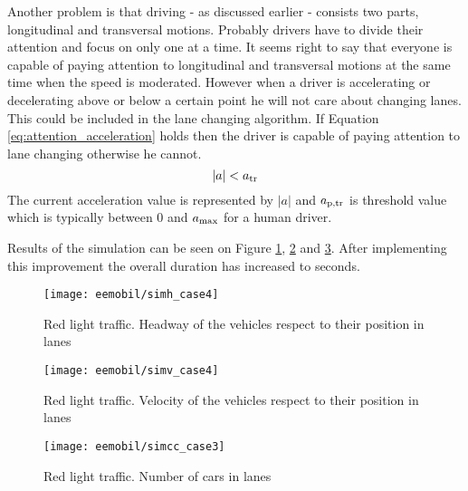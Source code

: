 		 Another problem is that driving - as discussed earlier - consists two parts, longitudinal and transversal motions. Probably drivers have to divide their attention and focus on only one at a time. It seems right to say that everyone is capable of paying attention to longitudinal and transversal motions at the same time when the speed is moderated. However when a driver is accelerating or decelerating above or below a certain point he will not care about changing lanes. This could be included in the lane changing algorithm. If Equation \ref{eq:attention_acceleration}  holds then the driver is capable of paying attention to lane changing otherwise he cannot.
		\begin{equation}
			|a|<a_{\rm tr}
			\label{eq:attention_acceleration}
		\end{equation}
		The current acceleration value is represented by $|a|$ and $a_{\rm p,tr}$ is threshold value which is typically between 0 and $a_{\rm max}$ for a human driver.
		
		Results of the simulation can be seen on Figure \ref{fig:red_light_situationh_impr3}, \ref{fig:red_light_situationv_impr3} and \ref{fig:red_light_situationcc_impr3}. After implementing this improvement the overall duration has increased to seconds.
		\begin{figure}
			\centering
			\texttt{[image: eemobil/simh\_case4]}
			\caption{Red light traffic. Headway of the vehicles respect to their position in lanes}
			\label{fig:red_light_situationh_impr3}
		\end{figure}
		\begin{figure}
			\centering
			\texttt{[image: eemobil/simv\_case4]}
			\caption{Red light traffic. Velocity of the vehicles respect to their position in lanes}
			\label{fig:red_light_situationv_impr3}
		\end{figure}
		\begin{figure}
			\centering
			\texttt{[image: eemobil/simcc\_case3]}
			\caption{Red light traffic. Number of cars in lanes }
			\label{fig:red_light_situationcc_impr3}
		\end{figure}
